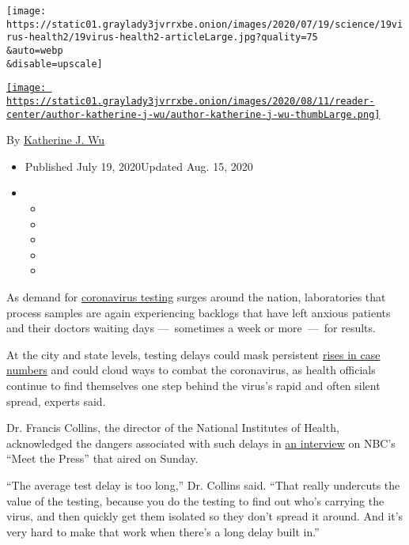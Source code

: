 \texttt{[image: https://static01.graylady3jvrrxbe.onion/images/2020/07/19/science/19virus-health2/19virus-health2-articleLarge.jpg?quality=75\\\&auto=webp\\\&disable=upscale]}

\href{https://www.nytimes3xbfgragh.onion/by/katherine-j--wu}{\texttt{[image: https://static01.graylady3jvrrxbe.onion/images/2020/08/11/reader-center/author-katherine-j-wu/author-katherine-j-wu-thumbLarge.png]}}

By
\href{https://www.nytimes3xbfgragh.onion/by/katherine-j--wu}{Katherine
J. Wu}

\begin{itemize}
\item
  Published July 19, 2020Updated Aug. 15, 2020
\item
  \begin{itemize}
  \item
  \item
  \item
  \item
  \item
  \end{itemize}
\end{itemize}

As demand for
\href{https://www.nytimes3xbfgragh.onion/2020/08/15/us/coronavirus-testing-decrease.html}{coronavirus
testing} surges around the nation, laboratories that process samples are
again experiencing backlogs that have left anxious patients and their
doctors waiting days ---~sometimes a week or more~---~for results.

At the city and state levels, testing delays could mask persistent
\href{https://www.nytimes3xbfgragh.onion/2020/07/21/health/coronavirus-infections-us.html}{rises
in case numbers} and could cloud ways to combat the coronavirus, as
health officials continue to find themselves one step behind the virus's
rapid and often silent spread, experts said.

Dr. Francis Collins, the director of the National Institutes of Health,
acknowledged the dangers associated with such delays in
\href{https://www.nbcnews.com/meet-the-press/video/full-nih-director-interview-all-americans-need-to-recognize-it-s-up-to-us-87958597515}{an
interview} on NBC's ``Meet the Press'' that aired on Sunday.

``The average test delay is too long,'' Dr. Collins said. ``That really
undercuts the value of the testing, because you do the testing to find
out who's carrying the virus, and then quickly get them isolated so they
don't spread it around. And it's very hard to make that work when
there's a long delay built in.''

